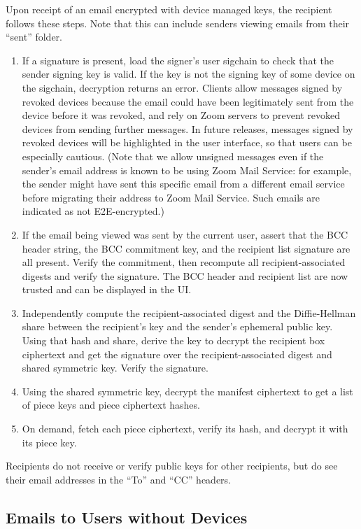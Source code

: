 Upon receipt of an email encrypted with device managed keys, the recipient follows these steps. Note
that this can include senders viewing emails from their ``sent'' folder.

\begin{enumerate}
\item If a signature is present, load the signer's user sigchain to check that the sender signing
key is valid. If the key is not the signing key of some device on the sigchain, decryption returns
an error. Clients allow messages signed by revoked devices because the email could have been
legitimately sent from the device before it was revoked, and rely on Zoom servers to prevent revoked
devices from sending further messages. In future releases, messages signed by revoked devices will
be highlighted in the user interface, so that users can be especially cautious. (Note that we allow
unsigned messages even if the sender's email address is known to be using Zoom Mail Service: for
example, the sender might have sent this specific email from a different email service before
migrating their address to Zoom Mail Service. Such emails are indicated as not E2E-encrypted.)
\item If the email being viewed was sent by the current user, assert that the BCC header string, the
BCC commitment key, and the recipient list signature are all present. Verify the commitment, then
recompute all recipient-associated digests and verify the signature. The BCC header and recipient
list are now trusted and can be displayed in the UI.
\item Independently compute the recipient-associated digest and the Diffie-Hellman share between the
recipient's key and the sender's ephemeral public key. Using that hash and share, derive the key to
decrypt the recipient box ciphertext and get the signature over the recipient-associated digest and
shared symmetric key. Verify the signature.
\item Using the shared symmetric key, decrypt the manifest ciphertext to get a list of piece keys
and piece ciphertext hashes.
\item On demand, fetch each piece ciphertext, verify its hash, and decrypt it with its piece key.
\end{enumerate}

Recipients do not receive or verify public keys for other recipients, but do see their email
addresses in the ``To'' and ``CC'' headers.

\subsection{Emails to Users without Devices}

